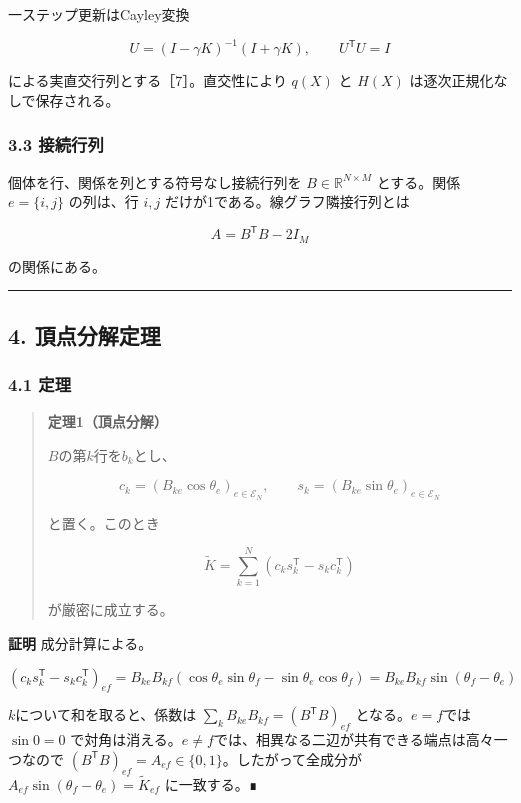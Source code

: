 \documentclass[
  a4paper,
]{ltjsarticle}
\begin{document}
一ステップ更新はCayley変換

\[
U=(I-\gamma K)^{-1}(I+\gamma K),
\qquad
U^{\mathsf T}U=I
\]

による実直交行列とする［7］。直交性により \(q(X)\) と \(H(X)\)
は逐次正規化なしで保存される。

\subsubsection{3.3 接続行列}\label{ux63a5ux7d9aux884cux5217}

個体を行、関係を列とする符号なし接続行列を \(B\in\mathbb R^{N\times M}\)
とする。関係 \(e=\{i,j\}\) の列は、行 \(i,j\)
だけが1である。線グラフ隣接行列とは

\[
A=B^{\mathsf T}B-2I_M
\]

の関係にある。

\begin{center}\rule{0.5\linewidth}{0.5pt}\end{center}

\subsection{4. 頂点分解定理}\label{ux9802ux70b9ux5206ux89e3ux5b9aux7406}

\subsubsection{4.1 定理}\label{ux5b9aux7406}

\begin{quote}
\textbf{定理1（頂点分解）}

\(B\)の第\(k\)行を\(b_k\)とし、

\[
c_k=(B_{ke}\cos\theta_e)_{e\in\mathcal E_N},
\qquad
s_k=(B_{ke}\sin\theta_e)_{e\in\mathcal E_N}
\]

と置く。このとき

\[
\widetilde K=\sum_{k=1}^{N}\left(c_k s_k^{\mathsf T}-s_k c_k^{\mathsf T}\right)
\]

が厳密に成立する。
\end{quote}

\textbf{証明} 成分計算による。

\[
\left(c_k s_k^{\mathsf T}-s_k c_k^{\mathsf T}\right)_{ef}
=
B_{ke}B_{kf}\left(\cos\theta_e\sin\theta_f-\sin\theta_e\cos\theta_f\right)
=
B_{ke}B_{kf}\sin(\theta_f-\theta_e)
\]

\(k\)について和を取ると、係数は
\(\sum_kB_{ke}B_{kf}=(B^{\mathsf T}B)_{ef}\) となる。\(e=f\)では
\(\sin0=0\)
で対角は消える。\(e\ne f\)では、相異なる二辺が共有できる端点は高々一つなので
\((B^{\mathsf T}B)_{ef}=A_{ef}\in\{0,1\}\)。したがって全成分が
\(A_{ef}\sin(\theta_f-\theta_e)=\widetilde K_{ef}\) に一致する。∎
\end{document}
